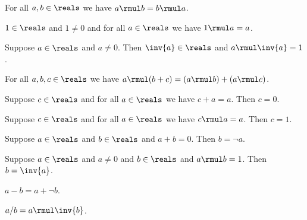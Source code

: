 \begin{axiom}\label{real_mul_comm}
    For all $a, b\in\reals$ we have $a \rmul b = b \rmul a$.
\end{axiom}

\begin{axiom}\label{real_mul_ident}
    $1\in\reals$ and $1\neq 0$ and for all $a\in\reals$ we have $1 \rmul a = a$.
\end{axiom}

\begin{axiom}\label{real_mul_inverse}
    Suppose $a\in\reals$ and $a\neq 0$.
    Then $\inv{a}\in\reals$ and $a \rmul \inv{a} = 1$.
\end{axiom}

\begin{axiom}\label{real_distrib}
    For all $a, b, c\in\reals$ we have $a \rmul (b + c) = (a \rmul b) + (a \rmul c)$.
\end{axiom}

\begin{proposition}\label{real_add_ident_unique}
    Suppose $c\in\reals$ and for all $a\in\reals$ we have $c + a = a$.
    Then $c = 0$.
\end{proposition}

\begin{proposition}\label{real_mul_ident_unique}
    Suppose $c\in\reals$ and for all $a\in\reals$ we have $c \rmul a = a$.
    Then $c = 1$.
\end{proposition}

\begin{proposition}\label{real_add_inverse_unique}
    Suppose $a\in\reals$ and $b\in\reals$ and $a + b = 0$.
    Then $b = \neg{a}$.
\end{proposition}

\begin{proposition}\label{real_mul_inverse_unique}
    Suppose $a\in\reals$ and $a\neq 0$ and $b\in\reals$ and $a \rmul b = 1$.
    Then $b = \inv{a}$.
\end{proposition}

\begin{definition}\label{real_sub}
    $a - b = a + \neg{b}$.
\end{definition}

\begin{definition}\label{real_div}
    $a / b = a \rmul \inv{b}$.
\end{definition}

